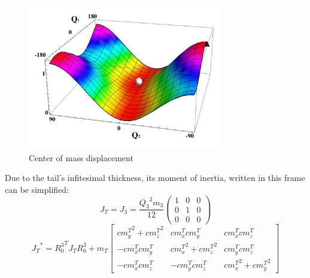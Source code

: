 \begin{figure}
	\centering
	\includegraphics[width=85mm]{./pictures/RobinRepicCM.pdf}
	\caption{Center of mass displacement}
	\label{fig:rmoment}
\end{figure}

Due to the tail's infitesimal thickness, its moment of inertia, written in this frame can be simplified:
\begin{equation}
J_T=J_3=\frac{{Q_3}^2 m_3}{12}\left(
\begin{array}{ccc}
 1 & 0 & 0 \\
 0 & 1 & 0 \\
 0 & 0 & 0
\end{array}
\right)
\end{equation} 
\small
\begin{equation}
{J_T}^*={R_0^3}^TJ_TR_0^3+m_T\begin{bmatrix}
{cm_y^T}^2 +{cm_z^T}^2& {cm_x^T}{cm_y^T}& {cm_x^T}{cm_z^T} \\ 
-{cm_x^T}{cm_y^T} & {cm_x^T}^2+{cm_z^T}^2 & {cm_y^T}{cm_z^T}\\ 
-{cm_x^T}{cm_z^T} & -{cm_y^T}{cm_z^T} & {cm_x^T}^2+{cm_y^T}^2
\end{bmatrix}
\end{equation}
\normalsize



